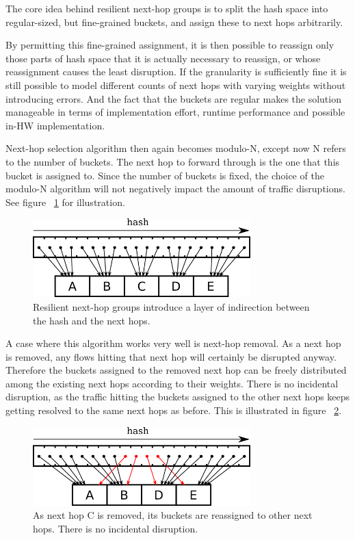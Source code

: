 \documentclass[letterpaper]{article}
\begin{document}
The core idea behind resilient next-hop groups is to split the hash space
into regular-sized, but fine-grained buckets, and assign these to next hops
arbitrarily.

By permitting this fine-grained assignment, it is then possible to reassign
only those parts of hash space that it is actually necessary to reassign,
or whose reassignment causes the least disruption. If the granularity is
sufficiently fine it is still possible to model different counts of next
hops with varying weights without introducing errors. And the fact that the
buckets are regular makes the solution manageable in terms of
implementation effort, runtime performance and possible in-HW
implementation.

Next-hop selection algorithm then again becomes modulo-N, except now N
refers to the number of buckets. The next hop to forward through is the one
that this bucket is assigned to. Since the number of buckets is fixed, the
choice of the modulo-N algorithm will not negatively impact the amount of
traffic disruptions. See figure ~\ref{fig:reshash-stable} for illustration.

\begin{figure}[H]
\includegraphics[width=3.31in]{reshash-stable.png}
\caption{Resilient next-hop groups introduce a layer of indirection between
  the hash and the next hops.}
\label{fig:reshash-stable}
\end{figure}

A case where this algorithm works very well is next-hop removal. As a next
hop is removed, any flows hitting that next hop will certainly be disrupted
anyway. Therefore the buckets assigned to the removed next hop can be
freely distributed among the existing next hops according to their weights.
There is no incidental disruption, as the traffic hitting the buckets
assigned to the other next hops keeps getting resolved to the same next
hops as before. This is illustrated in figure ~\ref{fig:reshash-removal}.

\begin{figure}[H]
\includegraphics[width=3.31in]{reshash-removal.png}
\caption{As next hop C is removed, its buckets are reassigned to other next
  hops. There is no incidental disruption.}
\label{fig:reshash-removal}
\end{figure}
\end{document}
